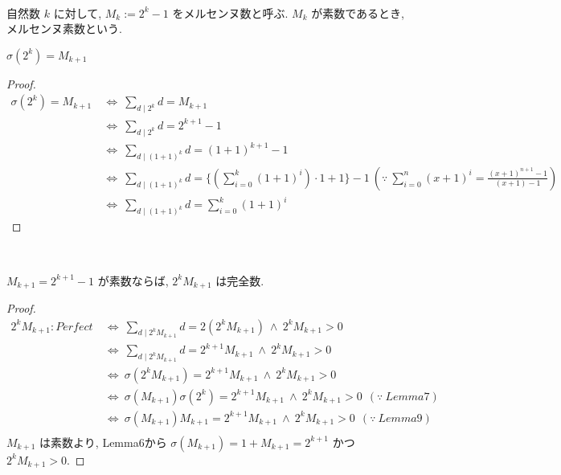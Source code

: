 \begin{definition}[メルセンヌ数]\label{Mersenne}\leanok~\

自然数 \(k\) に対して, \(M_k := 2^k - 1\) をメルセンヌ数と呼ぶ. \(M_k\) が素数であるとき,メルセンヌ素数という.

\end{definition}


\begin{lemma}\label{sigma_two_pow_eq_mersenne_succ}\leanok
{}
\(\sigma(2^k) = M_{k+1}\)
\end{lemma}

\begin{proof}
\begin{align*}
  \sigma(2^k) = M_{k+1} ~&\Leftrightarrow~ \sum_{d \mid 2^k} d = M_{k+1}\\
                        ~&\Leftrightarrow~ \sum_{d \mid 2^k} d = 2^{k+1} - 1\\
                        ~&\Leftrightarrow~ \sum_{d \mid (1+1)^k} d = (1+1)^{k+1} - 1\\
                        ~&\Leftrightarrow~ \sum_{d \mid (1+1)^k} d = \{(\sum_{i=0}^{k}(1+1)^i) \cdot 1 + 1\} - 1
                        ~(\because ~\sum_{i=0}^{n} (x+1)^i = \frac{(x+1)^{n+1}-1}{(x+1)-1})\\
                        ~&\Leftrightarrow~ \sum_{d \mid (1+1)^k} d = \sum_{i=0}^{k} (1+1)^i
\end{align*}
\end{proof}


\begin{theorem}[Euclid I]\label{perfect_two_pow_mul_mersenne_of_prime}
\leanok
{}~\

\(M_{k+1} = 2^{k+1} - 1\) が素数ならば, \(2^kM_{k+1}\) は完全数.

\end{theorem}

\begin{proof}
\begin{align*}
2^kM_{k+1} : Perfect ~&\Leftrightarrow~ \sum_{d \mid 2^kM_{k+1}} d = 2(2^kM_{k+1}) ~\wedge~ 2^kM_{k+1} > 0\\
                     ~&\Leftrightarrow~ \sum_{d \mid 2^kM_{k+1}} d = 2^{k+1}M_{k+1} ~\wedge~ 2^kM_{k+1} > 0\\
                     ~&\Leftrightarrow~ \sigma(2^kM_{k+1}) = 2^{k+1}M_{k+1} ~\wedge~ 2^kM_{k+1} > 0\\
                     ~&\Leftrightarrow~ \sigma(M_{k+1})\sigma(2^k) = 2^{k+1}M_{k+1} ~\wedge~ 2^kM_{k+1} > 0~~(\because~Lemma7)\\
                     ~&\Leftrightarrow~ \sigma(M_{k+1})M_{k+1} = 2^{k+1}M_{k+1} ~\wedge~ 2^kM_{k+1} > 0~~(\because~Lemma9)\\
\end{align*}
\(M_{k+1}\) は素数より, Lemma6から \(\sigma(M_{k+1}) = 1 + M_{k+1} = 2^{k+1}\) かつ \(2^kM_{k+1} > 0\).
\end{proof}



